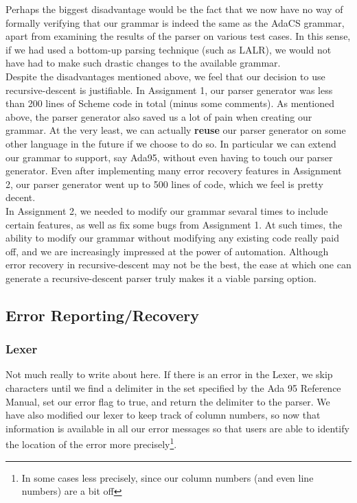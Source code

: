 \documentclass[onecolumn,11pt]{article}
\begin{document}
Perhaps the biggest disadvantage would be the fact that we now have no way of formally verifying that our grammar is indeed the same as the AdaCS grammar, apart from examining the results of the parser on various test cases. In this sense, if we had used a bottom-up parsing technique (such as LALR), we would not have had to make such drastic changes to the available grammar. \\

Despite the disadvantages mentioned above, we feel that our decision to use recursive-descent is justifiable. In Assignment 1, our parser generator was less than 200 lines of Scheme code in total (minus some comments). As mentioned above, the parser generator also saved us a lot of pain when creating our grammar. At the very least, we can actually \textbf{reuse} our parser generator on some other language in the future if we choose to do so. In particular we can extend our grammar to support, say Ada95, without even having to touch our parser generator. Even after implementing many error recovery features in Assignment 2, our parser generator went up to 500 lines of code, which we feel is pretty decent. \\

In Assignment 2, we needed to modify our grammar sevaral times to include certain features, as well as fix some bugs from Assignment 1. At such times, the ability to modify our grammar without modifying any existing code really paid off, and we are increasingly impressed at the power of automation. Although error recovery in recursive-descent may not be the best, the ease at which one can generate a recursive-descent parser truly makes it a viable parsing option. \\

\subsection{Error Reporting/Recovery}

\subsubsection{Lexer}
Not much really to write about here. If there is an error in the Lexer, we skip characters until we find a delimiter in the set specified by the Ada 95 Reference Manual, set our error flag to true, and return the delimiter to the parser. We have also modified our lexer to keep track of column numbers, so now that information is available in all our error messages so that users are able to identify the location of the error more precisely\footnote{In some cases less precisely, since our column numbers (and even line numbers) are a bit off}.
\end{document}
